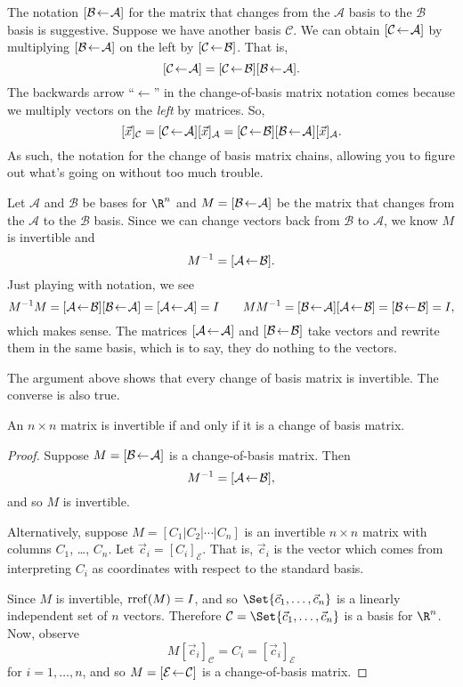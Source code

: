 The notation $\BasisChange{\mathcal A}{\mathcal B}$ for the matrix that changes from the $\mathcal A$ basis to
the $\mathcal B$ basis is suggestive. Suppose we have another basis $\mathcal C$. We can obtain
$\BasisChange{\mathcal A}{\mathcal C}$ by multiplying $\BasisChange{\mathcal A}{\mathcal B}$ on the left by $\BasisChange{\mathcal B}{\mathcal C}$.
That is,
\[
	\BasisChange{\mathcal A}{\mathcal C}=\BasisChange{\mathcal B}{\mathcal C}\BasisChange{\mathcal A}{\mathcal B}.
\]
The backwards arrow ``$\leftarrow$'' in the change-of-basis matrix notation comes because we multiply vectors on the
\emph{left} by matrices. So, \[
	[\vec x]_{\mathcal C}=
	\BasisChange{\mathcal A}{\mathcal C}[\vec x]_{\mathcal A}
	=\BasisChange{\mathcal B}{\mathcal C}\BasisChange{\mathcal A}{\mathcal B}[\vec x]_{\mathcal A}.
\]
As such, the notation for the change of basis matrix chains, allowing you to figure out what's going on without too much trouble.


Let $\mathcal A$ and $\mathcal B$ be bases for $\R^n$ and $M=\BasisChange{\mathcal A}{\mathcal B}$ be the matrix
that changes from the $\mathcal A$ to the $\mathcal B$ basis. Since we can change vectors back from $\mathcal B$ to
$\mathcal A$, we know $M$ is invertible and
\[
	M^{-1}=\BasisChange{\mathcal B}{\mathcal A}.
\]
Just playing with notation, we see
\[
	M^{-1}M=\BasisChange{\mathcal B}{\mathcal A}\BasisChange{\mathcal A}{\mathcal B}=\BasisChange{\mathcal A}{\mathcal A} = I\qquad
	MM^{-1}=\BasisChange{\mathcal A}{\mathcal B}\BasisChange{\mathcal B}{\mathcal A}=\BasisChange{\mathcal B}{\mathcal B} = I,
\]
which makes sense. The matrices $\BasisChange{\mathcal A}{\mathcal A}$ and $\BasisChange{\mathcal B}{\mathcal B}$
take vectors and rewrite them in the same basis, which is to say, they do nothing to the vectors.

The argument above shows that every change of basis matrix is invertible. The converse is also true.

\begin{theorem}
	An $n\times n$ matrix is invertible if and only if it is a change of basis matrix.
\end{theorem}
\begin{proof}
	Suppose $M=\BasisChange{\mathcal A}{\mathcal B}$ is a change-of-basis matrix. Then
	\[
		M^{-1}=\BasisChange{\mathcal B}{\mathcal A},
	\]
	and so $M$ is invertible.

	Alternatively, suppose $M=[C_1|C_2|\cdots|C_n]$ is an invertible $n\times n$ matrix with columns $C_1$, \ldots, $C_n$.
	Let $\vec c_i=[C_i]_{\mathcal E}$. That is, $\vec c_i$ is the vector which comes from interpreting $C_i$ as coordinates
	with respect to the standard basis.

	Since $M$ is invertible, $\Rref(M)=I$, and so $\Set{\vec c_1,\ldots,\vec c_n}$ is a linearly independent set of $n$ vectors.
	Therefore $\mathcal C=\Set{\vec c_1,\ldots,\vec c_n}$ is a basis for $\R^n$. Now, observe
	\[
		M[\vec c_i]_{\mathcal C} = C_i=[\vec c_i]_{\mathcal E}
	\]
	for $i=1,\ldots, n$,
	and so $M=\BasisChange{\mathcal C}{\mathcal E}$ is a change-of-basis matrix.
\end{proof}

